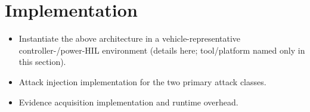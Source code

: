 \section{Implementation}
\label{sec:implementation}
\begin{itemize}
    \item Instantiate the above architecture in a vehicle-representative controller-/power-HIL environment (details here; tool/platform named only in this section).
    \item Attack injection implementation for the two primary attack classes.
    \item Evidence acquisition implementation and runtime overhead.
\end{itemize}
